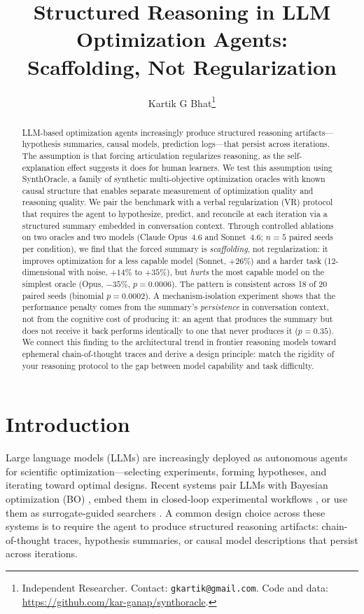 \documentclass[11pt,letterpaper]{article}
\title{\textbf{Structured Reasoning in LLM Optimization Agents:\\[2pt]
  Scaffolding, Not Regularization}}
\author{Kartik G Bhat\thanks{Independent Researcher. Contact:
  \texttt{gkartik@gmail.com}. Code and data:
  \url{https://github.com/kar-ganap/synthoracle}.}}
\date{}
\newcommand{\pval}[1]{\ensuremath{p = #1}}
\begin{document}
\maketitle

\begin{abstract}\noindent
LLM-based optimization agents increasingly produce structured reasoning
artifacts---hypothesis summaries, causal models, prediction logs---that
persist across iterations. The assumption is that forcing
articulation regularizes reasoning, as the self-explanation effect
suggests it does for human learners. We
test this assumption using SynthOracle, a family of synthetic
multi-objective optimization oracles with known causal structure that
enables separate measurement of optimization quality and reasoning
quality. We pair the benchmark with a verbal regularization (VR)
protocol that requires the agent to hypothesize, predict, and reconcile
at each iteration via a structured summary embedded in conversation
context. Through controlled ablations on two oracles and two models
(Claude Opus~4.6 and Sonnet~4.6; $n = 5$ paired seeds per condition),
we find that the forced summary is
\emph{scaffolding}, not regularization: it improves optimization for a
less capable model (Sonnet, $+26\%$) and a harder task (12-dimensional
with noise, $+14\%$ to $+35\%$), but \emph{hurts} the most capable
model on the simplest oracle (Opus, $-35\%$, \pval{0.0006}). The
pattern is consistent across 18 of 20 paired seeds (binomial
\pval{0.0002}). A mechanism-isolation experiment shows that the
performance penalty comes from the summary's \emph{persistence} in conversation context, not
from the cognitive cost of producing it: an agent that produces the
summary but does not receive it back performs identically to one that
never produces it (\pval{0.35}). We connect this finding to the
architectural trend in frontier reasoning models toward ephemeral
chain-of-thought traces and derive a design principle: match the rigidity
of your reasoning protocol to the gap between model capability and task
difficulty.
\end{abstract}

\section{Introduction}
\label{sec:intro}

Large language models (LLMs) are increasingly deployed as autonomous
agents for scientific optimization---selecting experiments, forming hypotheses, and
iterating toward optimal designs. Recent systems pair LLMs with Bayesian
optimization (BO) \cite{cisse2025bora}, embed them in closed-loop experimental
workflows \cite{boiko2023autonomous}, or use them as surrogate-guided
searchers \cite{ramos2024bayesian}. A common design choice across these
systems \cite{cisse2025bora, boiko2023autonomous} is to require the
agent to produce structured reasoning artifacts: chain-of-thought
traces, hypothesis summaries, or causal model descriptions that persist
across iterations.
\end{document}
